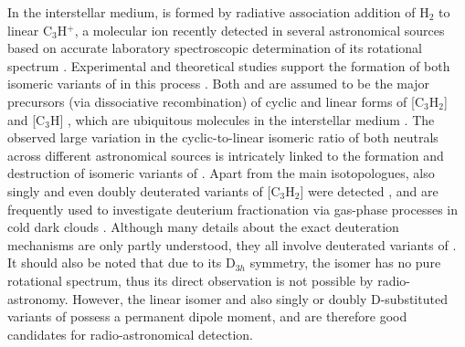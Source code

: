 In the interstellar medium, \iso is formed by radiative association addition of H$_2$ to linear C$_3$H$^+$, a molecular ion recently detected in several astronomical sources \citep{PGG2012,MCL2013,MCS2014} based on accurate laboratory spectroscopic determination of its rotational spectrum \citep{brunken_laboratory_2014,MCM2015}. Experimental and theoretical studies support the formation of both isomeric variants of \iso in this process \citep{SA1987,Adams1987,MMY1993}. Both \cyc and \lin  are assumed to be the major precursors (via dissociative recombination) of cyclic and linear forms of [C$_{3}$H$_{2}$] and [C$_3$H] \citep{Herbst1983, Adams1987, smith_ion_1992}, which are ubiquitous molecules in the interstellar medium \citep{Thaddeus1985,MI1985,CGG1991,KKO1991,CCF1999,YSO1987,TGH1985}. The observed large variation in the cyclic-to-linear isomeric ratio of both neutrals across different astronomical sources is intricately linked to the formation and destruction of isomeric variants of \iso \citep{MMH1993,CGP2015,SSC2016,LAW2017}. Apart from the main isotopologues, also singly and even doubly deuterated variants of [C$_{3}$H$_{2}$] were detected \citep{BFM1986,SBS2013,SGB2016}, and are frequently used to investigate deuterium fractionation via gas-phase processes in cold dark clouds \citep{GWC1987,BAM1988,MGA2017}. Although many details about the exact deuteration mechanisms are only partly understood, they all involve deuterated variants of \iso \citep{SSG2005,SBS2013}. It should also be noted that due to its D$_{3h}$ symmetry, the \cyc isomer has no pure rotational spectrum, thus its direct observation is not possible by radio-astronomy. However, the linear isomer \lin  and also singly or doubly D-substituted variants of \cyc possess a permanent dipole moment, and are therefore good candidates for radio-astronomical detection. \\  


